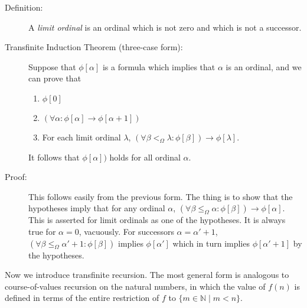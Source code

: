 \documentclass[12pt]{book}
\begin{document}
\begin{description}

\item[Definition:]  A {\em limit ordinal\/} is an ordinal which is not zero and which is not a successor.

\item[Transfinite Induction Theorem (three-case form):]  Suppose that $\phi[\alpha]$ is a formula which implies that $\alpha$ is an ordinal, and we can prove
that

\begin{enumerate}

\item  $\phi[0]$

\item $(\forall \alpha:\phi[\alpha] \rightarrow \phi[\alpha+1])$

\item For each limit ordinal $\lambda$, $(\forall \beta<_{\Omega}\lambda:\phi[\beta]) \rightarrow \phi[\lambda]$.

\end{enumerate}

It follows that $\phi[\alpha])$ holds for all ordinal $\alpha$.

\item[Proof:]  This follows easily from the previous form.  The thing is to show that the hypotheses imply that for any ordinal $\alpha$, $(\forall \beta \leq_{\Omega} \alpha: \phi[\beta]) \rightarrow \phi[\alpha]$.  This is asserted for limit ordinals as one of the hypotheses.  It is always true for $\alpha=0$, vacuously.  For successors $\alpha=\alpha'+1$, $(\forall \beta \leq_{\Omega} \alpha'+1: \phi[\beta])$ implies $\phi[\alpha']$ which in turn implies $\phi[\alpha'+1]$ by the hypotheses.

\end{description}

Now we introduce transfinite recursion.  The most general form is analogous to course-of-values recursion on the natural numbers, in which the value of $f(n)$ is defined in terms of the entire restriction of $f$ to $\{m \in {\mathbb N}\mid m < n\}$.
\end{document}
